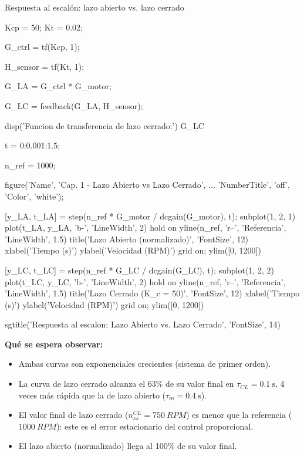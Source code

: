 \begin{matlabcodetitulo}{Respuesta al escalón: lazo abierto vs. lazo cerrado}

Kcp = 50;      %
Kt  = 0.02;    %

G_ctrl = tf(Kcp, 1);

H_sensor = tf(Kt, 1);

G_LA = G_ctrl * G_motor;

G_LC = feedback(G_LA, H_sensor);

disp('Funcion de transferencia de lazo cerrado:')
G_LC

t = 0:0.001:1.5;    %

n_ref = 1000;

figure('Name', 'Cap. 1 - Lazo Abierto vs Lazo Cerrado', ...
       'NumberTitle', 'off', 'Color', 'white');

[y_LA, t_LA] = step(n_ref * G_motor / dcgain(G_motor), t);
subplot(1, 2, 1)
plot(t_LA, y_LA, 'b-', 'LineWidth', 2)
hold on
yline(n_ref, 'r--', 'Referencia', 'LineWidth', 1.5)
title('Lazo Abierto (normalizado)', 'FontSize', 12)
xlabel('Tiempo (s)')
ylabel('Velocidad (RPM)')
grid on; ylim([0, 1200])

[y_LC, t_LC] = step(n_ref * G_LC / dcgain(G_LC), t);
subplot(1, 2, 2)
plot(t_LC, y_LC, 'b-', 'LineWidth', 2)
hold on
yline(n_ref, 'r--', 'Referencia', 'LineWidth', 1.5)
title('Lazo Cerrado (K_c = 50)', 'FontSize', 12)
xlabel('Tiempo (s)')
ylabel('Velocidad (RPM)')
grid on; ylim([0, 1200])

sgtitle('Respuesta al escalon: Lazo Abierto vs. Lazo Cerrado', 'FontSize', 14)
\end{matlabcodetitulo}

\textbf{Qué se espera observar:}
\begin{itemize}
  \item Ambas curvas son exponenciales crecientes (sistema de primer orden).
  \item La curva de lazo cerrado alcanza el 63\% de su valor final en $\tau_{CL} = \SI{0.1}{\second}$,
    4 veces más rápida que la de lazo abierto ($\tau_m = \SI{0.4}{\second}$).
  \item El valor final de lazo cerrado ($n_{ss}^{CL} = \SI{750}{RPM}$) es menor
    que la referencia ($\SI{1000}{RPM}$): este es el error estacionario del control proporcional.
  \item El lazo abierto (normalizado) llega al 100\% de su valor final.
\end{itemize}

